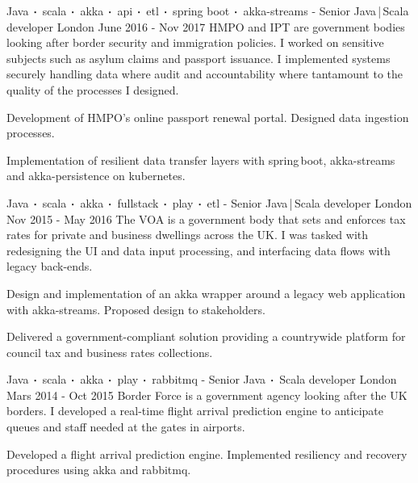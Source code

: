 \begin{cventries}
    \cventry
    {Java$\sqbig$scala$\sqbig$akka$\sqbig$api$\sqbig$etl$\sqbig$spring boot$\sqbig$akka-streams}
    { - Senior Java\,|\,Scala developer}
    {London}
    {June 2016 - Nov 2017}
    {HMPO and IPT are government bodies looking after border security and immigration policies. I worked on sensitive subjects such as asylum claims and passport issuance. I implemented systems securely handling data where audit and accountability where tantamount to the quality of the processes I designed.}
    {
        \begin{cvitems}
            \item{Development of HMPO's online passport renewal portal. Designed data ingestion processes.}
            \item{Implementation of resilient data transfer layers with spring\,boot, akka-streams and akka-persistence on kubernetes.}
        \end{cvitems}
    }

    \cventry
    {Java$\sqbig$scala$\sqbig$akka$\sqbig$fullstack$\sqbig$play$\sqbig$etl}
    { - Senior Java\,|\,Scala developer}
    {London}
    {Nov 2015 - May 2016}
    {The VOA is a government body that sets and enforces tax rates for private and business dwellings across the UK. I was tasked with redesigning the UI and data input processing, and interfacing data flows with legacy back-ends. }
    {
        \begin{cvitems}
            \item{Design and implementation of an akka wrapper around a legacy web application with akka-streams. Proposed design to stakeholders.}
            \item{Delivered a government-compliant solution providing a countrywide platform for council tax and business rates collections.}
        \end{cvitems}
    }

    \cventry
    {Java$\sqbig$scala$\sqbig$akka$\sqbig$play$\sqbig$rabbitmq}
    { - Senior Java$\sqbig$Scala developer}
    {London}
    {Mars 2014 - Oct 2015}
    {Border Force is a government agency looking after the UK borders. I developed a real-time flight arrival prediction engine to anticipate queues and staff needed at the gates in airports.}
    {
        \begin{cvitems}
            \item{Developed a flight arrival prediction engine. Implemented resiliency and recovery procedures using akka and rabbitmq.}
        \end{cvitems}
    }


\end{cventries}
